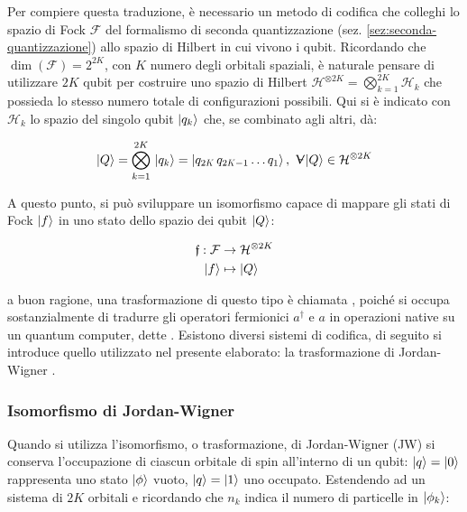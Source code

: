 Per compiere questa traduzione, è necessario un metodo di codifica che colleghi lo spazio di Fock $\mathcal{F}$ del formalismo di seconda quantizzazione (sez. \ref{sez:seconda-quantizzazione}) allo spazio di Hilbert in cui vivono i qubit. 
Ricordando che $\dim(\mathcal{F}) = 2^{2K}$, con $K$ numero degli orbitali spaziali, è naturale pensare di utilizzare $2K$ qubit per costruire uno spazio di Hilbert $\mathcal{H}^{\otimes 2K} = \bigotimes_{k=1}^{2K} \mathcal{H}_k$ che possieda lo stesso numero totale di configurazioni possibili. 
Qui si è indicato con $\mathcal{H}_k$ lo spazio del singolo qubit $\ket{q_k}$ che, se combinato agli altri, dà:

\begin{equation}\label{eqn:qubit-state}
    \ket{Q} = \bigotimes_{k=1}^{2K}\, \ket{q_k} = \ket{q_{2\scalebox{0.7}{$K$}}\,q_{2\scalebox{0.7}{$K$}-1} \dots q_1},\ 
    \forall \ket{Q} \in \mathcal{H}^{\otimes 2K}
\end{equation}

A questo punto, si può sviluppare un isomorfismo capace di mappare gli stati di Fock $\ket{f}$ in uno stato dello spazio dei qubit $\ket{Q}$:

\begin{equation}\label{eqn:isomorfismo-Fock-qubit}
\begin{aligned}
    \mathfrak{f}: \mathcal{F} &\to \mathcal{H}^{\otimes 2K}\\
    \ket{f} &\mapsto \ket{Q}
\end{aligned} 
\end{equation}

a buon ragione, una trasformazione di questo tipo è chiamata , poiché si occupa sostanzialmente di tradurre gli operatori fermionici $a^\dagger$ e $a$ in operazioni native su un quantum computer, dette . 
Esistono diversi sistemi di codifica, di seguito si introduce quello utilizzato nel presente elaborato: la trasformazione di Jordan-Wigner \cite{Jordan_Wigner}.

\subsubsection{Isomorfismo di Jordan-Wigner}\label{subsec:Jordan-Wigner}

Quando si utilizza l'isomorfismo, o trasformazione, di Jordan-Wigner (JW) si conserva l'occupazione di ciascun orbitale di spin all'interno di un qubit: $\ket{q}=\ket{0}$ rappresenta uno stato $\ket{\phi}$ vuoto, $\ket{q}=\ket{1}$ uno occupato. Estendendo ad un sistema di $2K$ orbitali e ricordando che $n_k$ indica il numero di particelle in $\ket{\phi_k}$:


